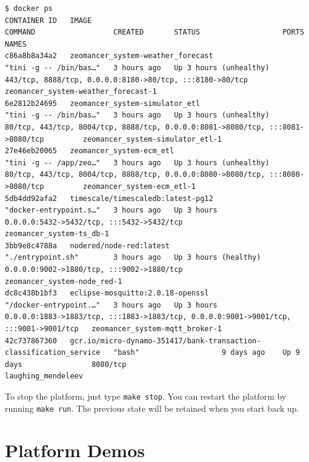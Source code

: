 \documentclass[
]{book}
\begin{document}
\begin{verbatim}
$ docker ps
CONTAINER ID   IMAGE                                                                COMMAND                  CREATED       STATUS                   PORTS                                                                                  NAMES
c86a8b8a34a2   zeomancer_system-weather_forecast                               "tini -g -- /bin/bas…"   3 hours ago   Up 3 hours (unhealthy)   443/tcp, 8888/tcp, 0.0.0.0:8180->80/tcp, :::8180->80/tcp                               zeomancer_system-weather_forecast-1
6e2812b24695   zeomancer_system-simulator_etl                                  "tini -g -- /bin/bas…"   3 hours ago   Up 3 hours (unhealthy)   80/tcp, 443/tcp, 8004/tcp, 8888/tcp, 0.0.0.0:8081->8080/tcp, :::8081->8080/tcp         zeomancer_system-simulator_etl-1
27e46eb20065   zeomancer_system-ecm_etl                                        "tini -g -- /app/zeo…"   3 hours ago   Up 3 hours (unhealthy)   80/tcp, 443/tcp, 8004/tcp, 8888/tcp, 0.0.0.0:8080->8080/tcp, :::8080->8080/tcp         zeomancer_system-ecm_etl-1
5db4dd92afa2   timescale/timescaledb:latest-pg12                                    "docker-entrypoint.s…"   3 hours ago   Up 3 hours               0.0.0.0:5432->5432/tcp, :::5432->5432/tcp                                              zeomancer_system-ts_db-1
3bb9e8c4788a   nodered/node-red:latest                                              "./entrypoint.sh"        3 hours ago   Up 3 hours (healthy)     0.0.0.0:9002->1880/tcp, :::9002->1880/tcp                                              zeomancer_system-node_red-1
dc8c438b1bf3   eclipse-mosquitto:2.0.18-openssl                                     "/docker-entrypoint.…"   3 hours ago   Up 3 hours               0.0.0.0:1883->1883/tcp, :::1883->1883/tcp, 0.0.0.0:9001->9001/tcp, :::9001->9001/tcp   zeomancer_system-mqtt_broker-1
42c737867360   gcr.io/micro-dynamo-351417/bank-transaction-classification_service   "bash"                   9 days ago    Up 9 days                8080/tcp                                                                               laughing_mendeleev
\end{verbatim}

To stop the platform, just type \texttt{make\ stop}.
You can restart the platform by running \texttt{make\ run}.
The previous state will be retained when you start back up.

\hypertarget{platform-demos}{%
\section{Platform Demos}\label{platform-demos}}
\end{document}
